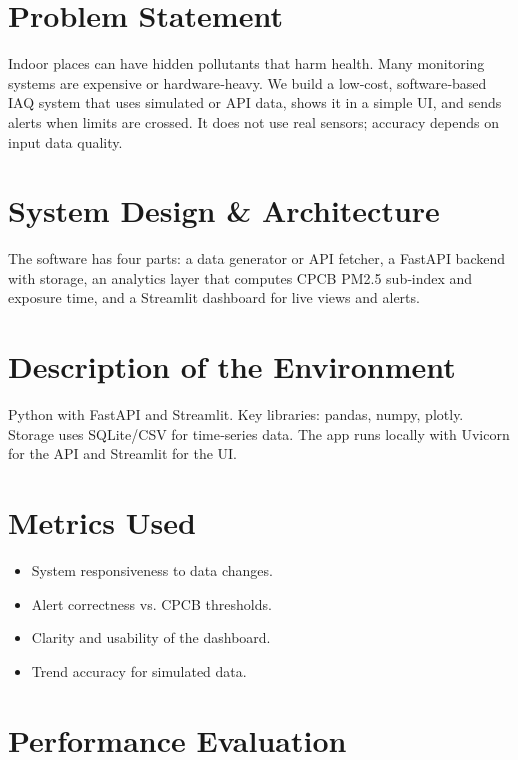 \documentclass[12pt]{report}
\begin{document}
\section{Problem Statement}
Indoor places can have hidden pollutants that harm health. Many monitoring systems are expensive or hardware‑heavy. We build a low‑cost, software‑based IAQ system that uses simulated or API data, shows it in a simple UI, and sends alerts when limits are crossed. It does not use real sensors; accuracy depends on input data quality.

\section{System Design \& Architecture}
The software has four parts: a data generator or API fetcher, a FastAPI backend with storage, an analytics layer that computes CPCB PM2.5 sub‑index and exposure time, and a Streamlit dashboard for live views and alerts.\\

\section{Description of the Environment}
Python with FastAPI and Streamlit. Key libraries: pandas, numpy, plotly. Storage uses SQLite/CSV for time‑series data. The app runs locally with Uvicorn for the API and Streamlit for the UI.

\section{Metrics Used}
\begin{itemize}
  \item System responsiveness to data changes.
  \item Alert correctness vs. CPCB thresholds.
  \item Clarity and usability of the dashboard.
  \item Trend accuracy for simulated data.
\end{itemize}

\section{Performance Evaluation}
\end{document}
